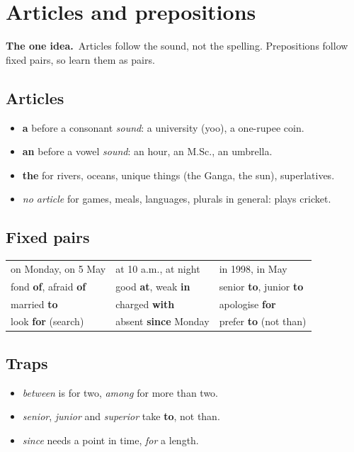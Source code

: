 \documentclass[11pt,a4paper]{article}
\let\oldsection\section
\renewcommand{\section}{\clearpage\oldsection}
\newcommand{\oneidea}[1]{\par\medskip\noindent\begingroup\setlength{\fboxsep}{7pt}%
  \colorbox{codebg}{\parbox{\dimexpr\linewidth-14pt\relax}{\textbf{\color{ember}The one idea.}\ #1}}\endgroup\par\medskip}
\newcommand{\bad}[1]{\textcolor{ember}{#1}}
\newcommand{\good}[1]{\textbf{#1}}
\begin{document}
\section{Articles and prepositions}
\oneidea{Articles follow the sound, not the spelling. Prepositions follow fixed pairs, so learn them as pairs.}
\subsection*{Articles}
\begin{itemize}
\item \good{a} before a consonant \emph{sound}: a university (yoo), a one-rupee coin.
\item \good{an} before a vowel \emph{sound}: an hour, an M.Sc., an umbrella.
\item \good{the} for rivers, oceans, unique things (the Ganga, the sun), superlatives.
\item \emph{no article} for games, meals, languages, plurals in general: plays cricket.
\end{itemize}
\subsection*{Fixed pairs}
\begin{center}\small\renewcommand{\arraystretch}{1.2}
\begin{tabularx}{\linewidth}{@{}>{\raggedright\arraybackslash}X >{\raggedright\arraybackslash}X >{\raggedright\arraybackslash}X@{}}
\toprule
on Monday, on 5 May & at 10 a.m., at night & in 1998, in May\\
fond \good{of}, afraid \good{of} & good \good{at}, weak \good{in} & senior \good{to}, junior \good{to}\\
married \good{to} & charged \good{with} & apologise \good{for}\\
look \good{for} (search) & absent \good{since} Monday & prefer \good{to} (not than)\\
\bottomrule
\end{tabularx}
\end{center}
\subsection*{Traps}
\begin{itemize}
\item \emph{between} is for two, \emph{among} for more than two.
\item \emph{senior}, \emph{junior} and \emph{superior} take \good{to}, not \bad{than}.
\item \emph{since} needs a point in time, \emph{for} a length.
\end{itemize}
\end{document}
